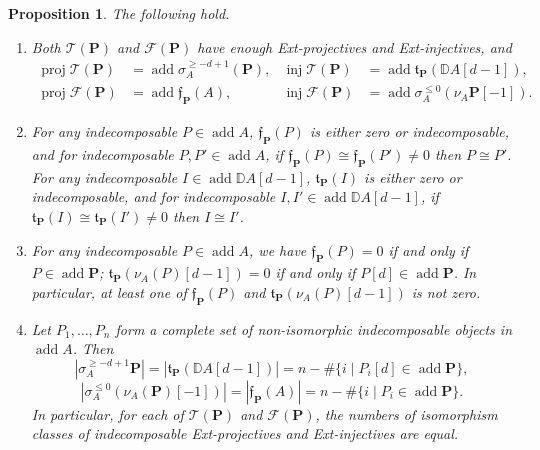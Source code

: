 \documentclass[11pt,a4paper,reqno]{amsart}
\theoremstyle{plain}
\newtheorem{proposition}[theorem]{Proposition}
\numberwithin{equation}{section}
\theoremstyle{definition}
\providecommand{\add}{\operatorname{add}}
\newcommand{\Proj}{\operatorname{proj}}
\newcommand{\Inj}{\operatorname{inj}}
\newcommand{\PP}{\mathbf{P}}
\newcommand{\T}{\mathcal{T}}
\newcommand{\F}{\mathcal{F}}
\begin{document}
\begin{proposition}\label{prop:Ext-proj-inj}
The following hold.
\begin{enumerate}
\item Both $\T(\PP)$ and $\F(\PP)$ have enough Ext-projectives and Ext-injectives, and
\begin{align*}
    \Proj\T(\PP)&=\add \sigma_A^{\geq-d+1}(\PP),&\Inj\T(\PP)&=\add\mathfrak{t}_{\PP}(\mathbb D A[d-1]),\\
    \Proj\F(\PP)&=\add\mathfrak{f}_{\PP}(A),&\Inj\F(\PP)&=\add \sigma_A^{\leq0}\left(\nu_A\PP[-1]\right).
\end{align*}
\item For any indecomposable $P\in\add A$, $\mathfrak{f}_{\PP}(P)$ is either zero or indecomposable, and for indecomposable $P,P'\in\add A$, if $\mathfrak{f}_{\PP}(P)\cong\mathfrak{f}_{\PP}(P')\ne0$ then $P\cong P'$. For any indecomposable $I\in\add \mathbb D A[d-1]$, $\mathfrak{t}_{\PP}(I)$ is either zero or indecomposable, and for indecomposable $I,I'\in\add \mathbb D A[d-1]$, if $\mathfrak{t}_{\PP}(I)\cong\mathfrak{t}_{\PP}(I')\ne0$ then $I\cong I'$.
\item For any indecomposable $P\in\add A$, we have $\mathfrak{f}_{\PP}(P)=0$ if and only if $P\in\add\PP$; $\mathfrak{t}_{\PP}(\nu_A(P)[d-1])=0$ if and only if $P[d]\in\add\PP$. In particular, at least one of $\mathfrak{f}_{\PP}(P)$ and $\mathfrak{t}_{\PP}(\nu_A(P)[d-1])$ is not zero.
\item Let $P_1,\ldots,P_n$ form a complete set of non-isomorphic indecomposable objects in $\add A$. Then
\[|\sigma_A^{\geq-d+1}\PP|= |\mathfrak{t}_{\PP}(\mathbb D A[d-1])|=n-\#\{i\mid P_i[d]\in\add\PP\},\]
\[|\sigma_A^{\leq0}\left(\nu_A(\PP)[-1]\right)|=|\mathfrak{f}_{\PP}(A)|=n-\#\{i\mid P_i\in\add\PP\}.\]
In particular, for each of $\T(\PP)$ and $\F(\PP)$, the numbers of isomorphism classes of indecomposable Ext-projectives and Ext-injectives are equal.
\end{enumerate}
\end{proposition}
\end{document}
